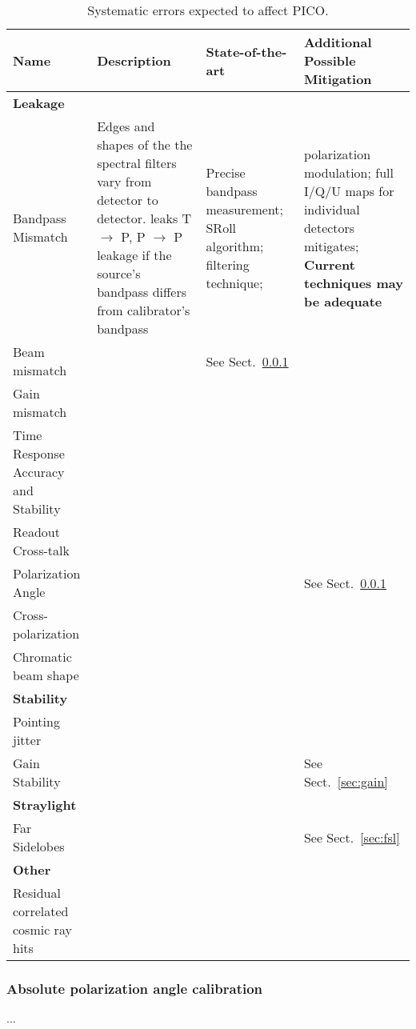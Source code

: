 \documentclass[PICOReport.tex]{subfiles}
\begin{document}
\begin{table}[h!]
\centering
\scriptsize
 \begin{tabular}{p{4.1cm} p{4.1cm} p{4.1cm} p{4.1cm}}
 \hline
\textbf{Name} & \textbf{Description} & \textbf{State-of-the-art} & \textbf{Additional Possible Mitigation} \\
 \hline
\textbf{Leakage} & & \\
 Bandpass Mismatch & 
 Edges and shapes of the the spectral filters vary from detector to detector. leaks T $\to$ P, P $\to$ P leakage if the source's bandpass differs from calibrator's bandpass\cite{Hoang_2017} & Precise bandpass measurement\cite{Pajot_2010};
SRoll algorithm\cite{Planck_Lowell}; filtering technique\cite{CORE_systematics};   &
polarization modulation; full I/Q/U maps for individual detectors mitigates; \textbf{Current techniques may be adequate}  \\
Beam mismatch & & See Sect.~\ref{sec:angle}
\\
Gain mismatch &
\\
Time Response Accuracy and Stability  &
\\
Readout Cross-talk & &
\\
Polarization Angle & & &
See Sect.~\ref{sec:angle}
\\

Cross-polarization &
\\
Chromatic beam shape
\\
\hline 
\textbf{Stability} & & \\

Pointing jitter
\\

Gain Stability & & &
See Sect.~\ref{sec:gain}
\\
\hline
\textbf{Straylight} & & \\
Far Sidelobes& & &
See Sect.~\ref{sec:fsl}\\
 \hline
\textbf{Other} \\
Residual correlated cosmic ray hits &
\\
\hline
 \end{tabular}
\caption{\label{tbl:SystematicsList} Systematic errors expected to affect PICO.}
 \end{table}

\subsubsection{Absolute polarization angle calibration}
\label{sec:angle}
...
\end{document}
